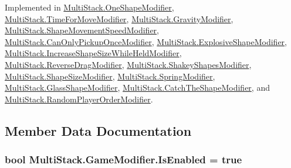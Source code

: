 Implemented in \hyperlink{class_multi_stack_1_1_one_shape_modifier_a26f5a41e291d04df9a55fd931ff834ec}{Multi\+Stack.\+One\+Shape\+Modifier}, \hyperlink{class_multi_stack_1_1_time_for_move_modifier_a52651c8cbe22e57c0e1d5dd3f4d5fafc}{Multi\+Stack.\+Time\+For\+Move\+Modifier}, \hyperlink{class_multi_stack_1_1_gravity_modifier_a709194d36407f2910ceff941785d8720}{Multi\+Stack.\+Gravity\+Modifier}, \hyperlink{class_multi_stack_1_1_shape_movement_speed_modifier_a6c8209e8db355d3b3204167c76049503}{Multi\+Stack.\+Shape\+Movement\+Speed\+Modifier}, \hyperlink{class_multi_stack_1_1_can_only_pickup_once_modifier_a5375d39256e231f65b9dddc86581b185}{Multi\+Stack.\+Can\+Only\+Pickup\+Once\+Modifier}, \hyperlink{class_multi_stack_1_1_explosive_shape_modifier_a48727a773c318122bc369a48079f2f30}{Multi\+Stack.\+Explosive\+Shape\+Modifier}, \hyperlink{class_multi_stack_1_1_increase_shape_size_while_held_modifier_a936b7d337b1aa5febcfd6eb2ad37a016}{Multi\+Stack.\+Increase\+Shape\+Size\+While\+Held\+Modifier}, \hyperlink{class_multi_stack_1_1_reverse_drag_modifier_a32d5963443ed0867c51c97f76128d3ec}{Multi\+Stack.\+Reverse\+Drag\+Modifier}, \hyperlink{class_multi_stack_1_1_shakey_shapes_modifier_a10f32463b2e5e38d7b50698232e145b4}{Multi\+Stack.\+Shakey\+Shapes\+Modifier}, \hyperlink{class_multi_stack_1_1_shape_size_modifier_a74e6cc4af581e1167679d0b3d9740785}{Multi\+Stack.\+Shape\+Size\+Modifier}, \hyperlink{class_multi_stack_1_1_spring_modifier_ae6aaf8c2806a1c844b1700977efb2dbc}{Multi\+Stack.\+Spring\+Modifier}, \hyperlink{class_multi_stack_1_1_glass_shape_modifier_a44026d971a40d8e5ce02f2611be19b0f}{Multi\+Stack.\+Glass\+Shape\+Modifier}, \hyperlink{class_multi_stack_1_1_catch_the_shape_modifier_ad6ad792bcc0ae5fdd4890af7ec5fe7b1}{Multi\+Stack.\+Catch\+The\+Shape\+Modifier}, and \hyperlink{class_multi_stack_1_1_random_player_order_modifier_a75341a38b55dde95e4037d5ce829ed72}{Multi\+Stack.\+Random\+Player\+Order\+Modifier}.



\subsection{Member Data Documentation}
\hypertarget{class_multi_stack_1_1_game_modifier_a307c902c8fb9fac72d7a4dd74a6bf050}{}
\subsubsection[{Is\+Enabled}]{\setlength{\rightskip}{0pt plus 5cm}bool Multi\+Stack.\+Game\+Modifier.\+Is\+Enabled = true}\label{class_multi_stack_1_1_game_modifier_a307c902c8fb9fac72d7a4dd74a6bf050}


